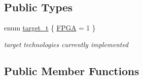 \subsection*{Public Types}
\begin{DoxyCompactItemize}
\item 
enum \hyperlink{classtarget__technology_a84257c2d384aa7dce6a060105113459b}{target\+\_\+t} \{ \hyperlink{classtarget__technology_a84257c2d384aa7dce6a060105113459bac267ed94b245c882d8f0effb244f60fb}{F\+P\+GA} = 1
 \}\begin{DoxyCompactList}\small\item\em target technologies currently implemented \end{DoxyCompactList}
\end{DoxyCompactItemize}
\subsection*{Public Member Functions}
